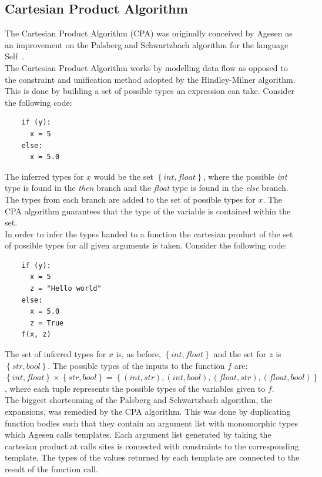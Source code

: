 \documentclass[12pt, titlepage]{article}
\begin{document}
\subsection{Cartesian Product Algorithm}
The Cartesian Product Algorithm (CPA) was originally conceived by Agesen as an improvement on the Palsberg and Schwartzbach algorithm for the language Self~\cite{agesen95}. \\
The Cartesian Product Algorithm works by modelling data flow as opposed to the constraint and unification method adopted by the Hindley-Milner algorithm. This is done by building a set of possible types an expression can take. Consider the following code:
\begin{lstlisting}
    if (y):	
      x = 5     
    else:
      x = 5.0  
\end{lstlisting}
The inferred types for $x$ would be the set $\left\{ {int, float}\right\}$, where the possible \textit{int} type is found in the \textit{then} branch and the \textit{float} type is found in the \textit{else} branch. The types from each branch are added to the set of possible types for $x$. The CPA algorithm guarantees that the type of the variable is contained within the set. \\
In order to infer the types handed to a function the cartesian product of the set of possible types for all given arguments is taken. Consider the following code:
\begin{lstlisting}
    if (y):	
      x = 5 
      z = "Hello world"    
    else:
      x = 5.0 
      z = True
    f(x, z)
\end{lstlisting}
The set of inferred types for $x$ is, as before, $\left\{ {int, float}\right\}$ and the set for $z$ is $\left\{ {str, bool}\right\}$. The possible types of the inputs to the function $f$ are: $\left\{ {int, float}\right\} \times \left\{ {str, bool}\right\} = \left\{ {(int, str), (int, bool), (float, str), (float, bool)}\right\}$, where each tuple represents the possible types of the variables given to $f$. \\
The biggest shortcoming of the Palsberg and Schwartzbach algorithm, the expansions, was remedied by the CPA algorithm. This was done by duplicating function bodies such that they contain an argument list with monomorphic types which Agesen calls templates. Each argument list generated by taking the cartesian product at calls sites is connected with constraints to the corresponding template. The types of the values returned by each template are connected to the result of the function call.
\end{document}
